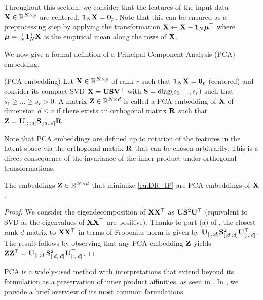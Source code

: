 \begin{remark}
	Throughout this section, we consider that the features of the input data ${\mathbf{X}} \in \mathbb{R}^{N \times p}$ are centered, \ie $\bm{1}_N {\mathbf{X}} = \bm{0}_p$. Note that this can be ensured as a preprocessing step by applying the transformation ${\mathbf{X}} \leftarrow {\mathbf{X}} - \bm{1}_N \bm{\mu}^\top$ where $\bm{\mu} = \frac{1}{N} \bm{1}_N^\top {\mathbf{X}}$ is the empirical mean along the rows of ${\mathbf{X}}$.
\end{remark}

We now give a formal defintion of a Principal Component Analysis (PCA) embedding.

\begin{definition}{(PCA embedding)}\label{def:PCA_embedding}
	Let ${\mathbf{X}} \in \mathbb{R}^{N \times p}$ of rank $r$ such that $\bm{1}_N {\mathbf{X}} = \bm{0}_p$ (centered) and consider its compact SVD ${\mathbf{X}} = {\mathbf{U}} {\mathbf{S}} {\mathbf{V}}^\top$ with ${\mathbf{S}} = \operatorname{diag}(s_1, ..., s_r)$ such that $s_1 \geq ... \geq s_r > 0$. A matrix
	${\mathbf{Z}} \in \mathbb{R}^{N \times d}$ is called a PCA embedding of ${\mathbf{X}}$ of dimension $d \leq r$ if there exists an orthogonal matrix ${\mathbf{R}}$ such that ${\mathbf{Z}} = {\mathbf{U}}_{[:,:d]} {\mathbf{S}}_{[:d,:d]} {\mathbf{R}}$.
\end{definition}

\begin{remark}
	Note that PCA embeddings are defined up to rotation of the features in the latent space via the orthogonal matrix ${\mathbf{R}}$ that can be chosen arbitrarily. This is a direct consequence of the invariance of the inner product under orthogonal transformations.
\end{remark}

\begin{proposition}\label{prop:PCA_embedding}
	The embeddings ${\mathbf{Z}} \in \mathbb{R}^{N \times d}$ that minimize \ref{eq:DR_IP} are PCA embeddings of ${\mathbf{X}}$.
\end{proposition}

\begin{proof}
	We consider the eigendecomposition of ${\mathbf{X}} {\mathbf{X}}^\top$ as ${\mathbf{U}} {\mathbf{S}}^2 {\mathbf{U}}^\top$ (equivalent to SVD as the eigenvalues of ${\mathbf{X}} {\mathbf{X}}^\top$ are positive). Thanks to part (a) of , the closest rank-$d$ matrix to ${\mathbf{X}} {\mathbf{X}}^\top$ in terms of Frobenius norm is given by ${\mathbf{U}}_{[:,:d]} {\mathbf{S}}_{[:d,:d]}^2 {\mathbf{U}}_{[:,:d]}^\top$.
	The result follows by observing that any PCA embedding ${\mathbf{Z}}$ yields ${\mathbf{Z}} {\mathbf{Z}}^\top = {\mathbf{U}}_{[:,:d]} {\mathbf{S}}_{[:d,:d]}^2 {\mathbf{U}}_{[:,:d]}^\top$.
\end{proof}

PCA is a widely-used method with interpretations that extend beyond its formulation as a preservation of inner product affinities, as seen in . In , we provide a brief overview of its most common formulations.

